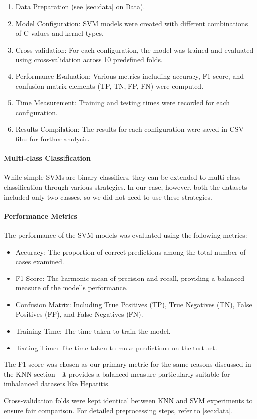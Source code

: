 \begin{enumerate}
    \item Data Preparation (see \autoref{sec:data} on Data).
    \item Model Configuration: SVM models were created with different combinations of C values and kernel types.
    \item Cross-validation: For each configuration, the model was trained and evaluated using cross-validation across 10 predefined folds.
    \item Performance Evaluation: Various metrics including accuracy, F1 score, and confusion matrix elements (TP, TN, FP, FN) were computed.
    \item Time Measurement: Training and testing times were recorded for each configuration.
    \item Results Compilation: The results for each configuration were saved in CSV files for further analysis.
\end{enumerate}

\paragraph{Multi-class Classification} 
While simple SVMs are binary classifiers, they can be extended to multi-class classification through various strategies.
In our case, however, both the datasets included only two classes, so we did not need to use these strategies.

\paragraph{Performance Metrics}
The performance of the SVM models was evaluated using the following metrics:

\begin{itemize}
    \item Accuracy: The proportion of correct predictions among the total number of cases examined.
    \item F1 Score: The harmonic mean of precision and recall, providing a balanced measure of the model's performance.
    \item Confusion Matrix: Including True Positives (TP), True Negatives (TN), False Positives (FP), and False Negatives (FN).
    \item Training Time: The time taken to train the model.
    \item Testing Time: The time taken to make predictions on the test set.
\end{itemize}
The F1 score was chosen as our primary metric for the same reasons discussed in the KNN section - it provides a balanced measure particularly suitable for imbalanced datasets like Hepatitis.

Cross-validation folds were kept identical between KNN and SVM experiments to ensure fair comparison. For detailed preprocessing steps, refer to \autoref{sec:data}.

